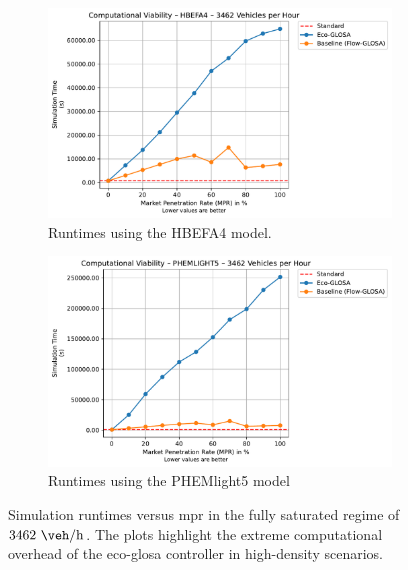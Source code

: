 \begin{figure}[htb]
  \centering
  \begin{subfigure}[b]{0.45\textwidth}
    \includegraphics[width=\textwidth]{data/img/ComputationalViability/ComputationalViability_HBEFA4_Cars3462.pdf}
    \caption{Runtimes using the HBEFA4 model.}
    \label{fig:Comp_3462_HBEFA4}
  \end{subfigure}\hfill
  \begin{subfigure}[b]{0.45\textwidth}
    \includegraphics[width=\textwidth]{data/img/ComputationalViability/ComputationalViability_PHEMLIGHT5_Cars3462.pdf}
    \caption{Runtimes using the PHEMlight5 model}
    \label{fig:Comp_3462_PHEM}
  \end{subfigure}
  \caption[Computational Cost in Saturated Conditions]{Simulation runtimes versus \ac{mpr} in the fully saturated regime of $3462~\unit{\veh\per\hour}$. The plots highlight the extreme computational overhead of the \ac{eco-glosa} controller in high-density scenarios.}
  \label{fig:Comp_3462}
\end{figure}

